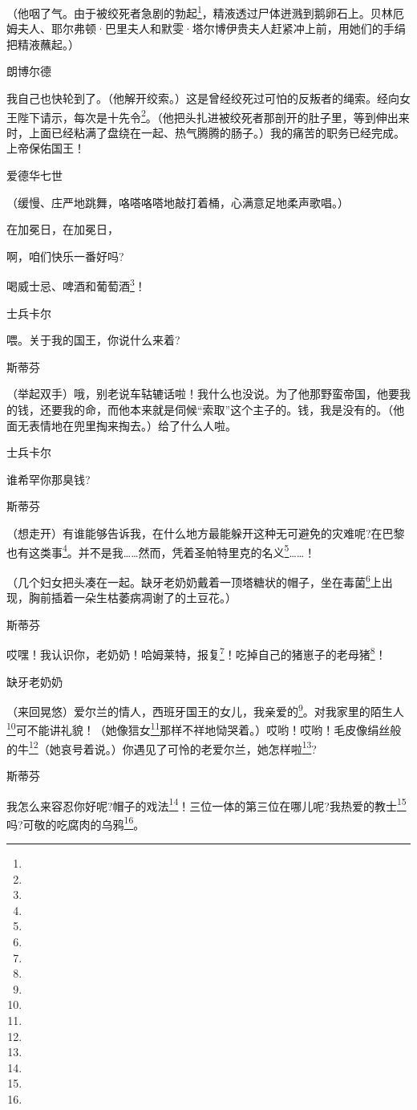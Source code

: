 \par （他咽了气。由于被绞死者急剧的勃起\footnote{}，精液透过尸体迸溅到鹅卵石上。贝林厄姆夫人、耶尔弗顿·巴里夫人和默雯·塔尔博伊贵夫人赶紧冲上前，用她们的手绢把精液蘸起。）
\par 朗博尔德
\par 我自己也快轮到了。（他解开绞索。）这是曾经绞死过可怕的反叛者的绳索。经向女王陛下请示，每次是十先令\footnote{}。（他把头扎进被绞死者那剖开的肚子里，等到伸出来时，上面已经粘满了盘绕在一起、热气腾腾的肠子。）我的痛苦的职务已经完成。上帝保佑国王！
\par 爱德华七世
\par （缓慢、庄严地跳舞，咯嗒咯嗒地敲打着桶，心满意足地柔声歌唱。）
\par 在加冕日，在加冕日，
\par 啊，咱们快乐一番好吗?
\par 喝威士忌、啤酒和葡萄酒\footnote{}！
\par 士兵卡尔
\par 喂。关于我的国王，你说什么来着?
\par 斯蒂芬
\par （举起双手）哦，别老说车轱辘话啦！我什么也没说。为了他那野蛮帝国，他要我的钱，还要我的命，而他本来就是伺候“索取”这个主子的。钱，我是没有的。（他面无表情地在兜里掏来掏去。）给了什么人啦。
\par 士兵卡尔
\par 谁希罕你那臭钱?
\par 斯蒂芬
\par （想走开）有谁能够告诉我，在什么地方最能躲开这种无可避免的灾难呢?在巴黎也有这类事\footnote{}。并不是我……然而，凭着圣帕特里克的名义\footnote{}……！
\par （几个妇女把头凑在一起。缺牙老奶奶戴着一顶塔糖状的帽子，坐在毒菌\footnote{}上出现，胸前插着一朵生枯萎病凋谢了的土豆花。）
\par 斯蒂芬
\par 哎嘿！我认识你，老奶奶！哈姆莱特，报复\footnote{}！吃掉自己的猪崽子的老母猪\footnote{}！
\par 缺牙老奶奶
\par （来回晃悠）爱尔兰的情人，西班牙国王的女儿，我亲爱的\footnote{}。对我家里的陌生人\footnote{}可不能讲礼貌！（她像狺女\footnote{}那样不祥地恸哭着。）哎哟！哎哟！毛皮像绢丝般的牛\footnote{}（她哀号着说。）你遇见了可怜的老爱尔兰，她怎样啦\footnote{}?
\par 斯蒂芬
\par 我怎么来容忍你好呢?帽子的戏法\footnote{}！三位一体的第三位在哪儿呢?我热爱的教士\footnote{}吗?可敬的吃腐肉的乌鸦\footnote{}。
